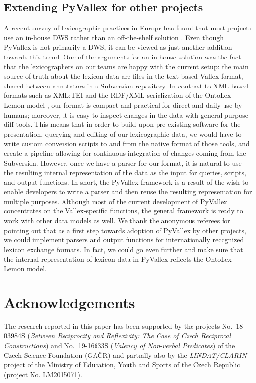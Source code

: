 \documentclass[10pt, a4paper]{article}
\begin{document}
\subsection{Extending PyVallex for other projects}
A recent survey of lexicographic practices in Europe  has found that most projects use an in-house DWS rather than an off-the-shelf solution
\cite{KallasEtAl19lexicographic}.
Even though PyVallex is not primarily a DWS, it can be viewed as just another addition towards this trend.
One of the arguments for an in-house solution was the fact that the lexicographers on our teams are happy with the current setup:
the main source of truth about the lexicon data are files in the text-based Vallex format,
shared between annotators in a Subversion repository.
In contrast to XML-based formats such as XML:TEI \cite{XMLTEI2020}
and the RDF/XML serialization of the OntoLex-Lemon model \cite{BosqueGilGracia19OntoLex},
our format is compact and practical for direct and daily use by humans;
moreover, it is easy to inspect changes in the data with general-purpose diff tools.
This means that in order to build upon pre-existing software for the presentation, querying and editing of our lexicographic data,
we would have to write custom conversion scripts to and from the native format of those tools,
and create a pipeline allowing for continuous integration of changes coming from the Subversion.
However, once we have a parser for our format,
it is natural to use the resulting internal representation of the data as the input for queries, scripts, and output functions.
In short, the PyVallex framework is a result of the wish to enable developers to write a parser and then reuse the resulting representation for multiple purposes.
Although most of the current development of PyVallex concentrates on the Vallex-specific functions,
the general framework is ready to work with other data models as well.
We thank the anonymous referees for pointing out that as a first step towards adoption of PyVallex by other projects,
we could implement parsers and output functions for internationally recognized lexicon exchange formats.
In fact, we could go even further and make sure that the internal representation of lexicon data in PyVallex reflects the OntoLex-Lemon model.


\section{Acknowledgements}
The research reported in this paper has been supported by the projects No.\ 18-03984S (\textit{Between Reciprocity and Reflexivity: The Case of Czech Reciprocal Constructions}) and No.\ 19-16633S (\textit{Valency of Non-verbal Predicates}) of the  Czech Science Foundation (GA{\v{C}R}) and partially also by the \textit{LINDAT/CLARIN} project of the Ministry of Education, Youth and Sports of the Czech Republic (project No. LM2015071).
\end{document}
